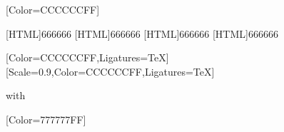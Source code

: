 \renewfontfamily{}[Color=CCCCCCFF]

[HTML]{666666}
[HTML]{666666}
[HTML]{666666}
[HTML]{666666}
\begin{paracol}{2}
[Color=CCCCCCFF,Ligatures=TeX]
\renewfontfamily{}[Scale=0.9,Color=CCCCCCFF,Ligatures=TeX]
\null
\vfill
\begin{center}
    with
\end{center}
\vfill
\newpage
\end{paracol}

\renewfontfamily{}[Color=777777FF]

